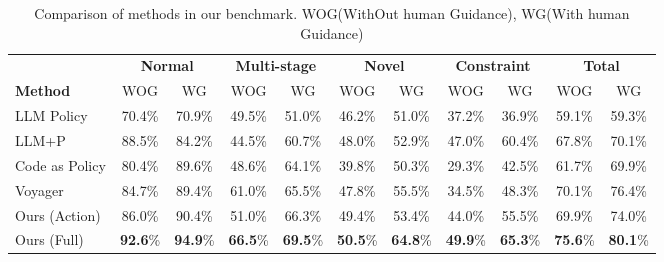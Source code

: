 \begin{table*}[ht]
    \centering
    \scriptsize
    \renewcommand{\arraystretch}{1.5}
    \begin{adjustbox}{width=\textwidth}
    \begin{tabular}{l c c c c c c c c c c}
        \hline
                        & \multicolumn{2}{c}{\textbf{Normal}} & \multicolumn{2}{c}{\textbf{Multi-stage}} & \multicolumn{2}{c}{\textbf{Novel}} & \multicolumn{2}{c}{\textbf{Constraint}} & \multicolumn{2}{c}{\textbf{Total}}\\ 
        \textbf{Method}     &WOG    &WG       &WOG    &WG       &WOG    &WG       &WOG    &WG       &WOG    &WG \\ \cline{2-3} \cline{4-5} \cline{6-7} \cline{8-9} \cline{10-11}
        LLM Policy     & 70.4\%& 70.9\%& 49.5\%& 51.0\%& 46.2\%& 51.0\%& 37.2\%& 36.9\%& 59.1\%& 59.3\%\\
        LLM+P          & 88.5\%& 84.2\%& 44.5\%& 60.7\%& 48.0\%& 52.9\%& 47.0\%& 60.4\%& 67.8\%& 70.1\%\\
        Code as Policy & 80.4\%& 89.6\%& 48.6\%& 64.1\%& 39.8\%& 50.3\%& 29.3\%& 42.5\%& 61.7\%& 69.9\%\\
        Voyager        & 84.7\%& 89.4\%& 61.0\%& 65.5\%& 47.8\%& 55.5\%& 34.5\%& 48.3\%& 70.1\%& 76.4\%\\
        Ours (Action)  & 86.0\%& 90.4\%& 51.0\%& 66.3\%& 49.4\%& 53.4\%& 44.0\%& 55.5\%& 69.9\%& 74.0\%\\
        Ours (Full)    & \textbf{92.6}\%& \textbf{94.9}\%& \textbf{66.5}\%& \textbf{69.5}\%& \textbf{50.5}\%& \textbf{64.8}\%& \textbf{49.9}\%& \textbf{65.3}\%& \textbf{75.6}\%& \textbf{80.1}\%\\
        \hline
    \end{tabular}
    \end{adjustbox}
    \caption{Comparison of methods in our benchmark. WOG(WithOut human Guidance), WG(With human Guidance)}
    \label{tab:results}
\end{table*}